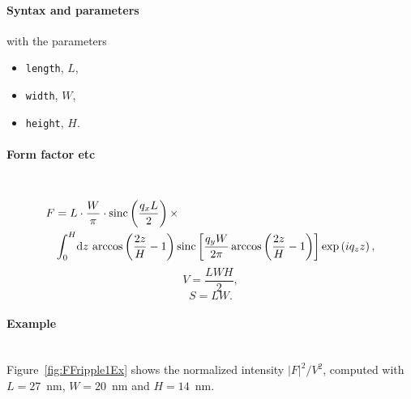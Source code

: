\paragraph{Syntax and parameters}
\begin{quote}
\end{quote}
with the parameters
\begin{itemize}
\item \texttt{length}, $L$, 
\item \texttt{width}, $W$, 
\item \texttt{height}, $H$. 
\end{itemize}


\paragraph{Form factor etc}\strut\\
\begin{align*}
F &=L \cdot \frac{W}{\pi}\cdot \operatorname{sinc}\left(\frac{q_xL}{2}\right)\times \\
&\int_0^H\!\text{d} z\, \arccos\left(\frac{2z}{H}-1\right)\operatorname{sinc}\left[\frac{q_yW}{2\pi}\arccos\left(\frac{2z}{H} - 1\right)\right]\exp\left(iq_zz\right),
\end{align*}
\begin{equation*}
  V = \dfrac{L W H}{2},
\end{equation*}
\begin{equation*}
  S = L W.
\end{equation*}

\paragraph{Example}\strut\\
Figure~\ref{fig:FFripple1Ex} shows the normalized intensity
$|F|^2/V^2$, computed with $L=27$~nm, $W=20$~nm and $H=14$~nm.


